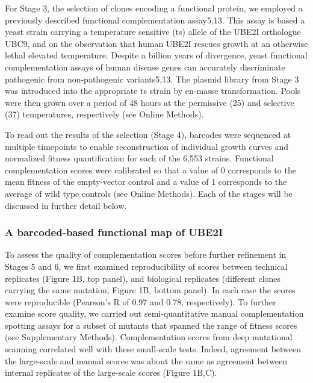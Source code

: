 For Stage 3, the selection of clones encoding a functional protein, we employed a previously described  functional complementation assay5,13. This assay is based a yeast strain carrying a temperature sensitive (ts) allele of the UBE2I orthologue UBC9, and on the observation that human UBE2I rescues growth at an otherwise lethal elevated temperature.  Despite a billion years of divergence, yeast functional complementation assays of human disease genes can accurately discriminate pathogenic from non-pathogenic variants5,13.  The plasmid library from Stage 3 was introduced into the appropriate ts strain by en-masse transformation. Pools were then grown over a period of 48 hours at the permissive (25\celsius ) and selective (37\celsius ) temperatures, respectively (see Online Methods).

To read out the results of the selection (Stage 4), barcodes were sequenced at multiple timepoints to enable reconstruction of individual growth curves and normalized fitness quantification for each of the 6,553 strains. Functional complementation scores were calibrated so that a value of 0 corresponds to the mean fitness of the empty-vector control and a value of 1 corresponds to the average of wild type controls (see Online Methods). Each of the stages will be discussed in further detail below.


\subsubsection{A barcoded-based functional map of UBE2I}

To assess the quality of complementation scores before further refinement in Stages 5 and 6, we first examined reproducibility of scores between technical replicates (Figure 1B, top panel), and biological replicates (different clones carrying the same mutation; Figure 1B, bottom panel).  In each case the scores were reproducible (Pearson’s R of 0.97 and 0.78, respectively).   To further examine score quality, we carried out semi-quantitative manual complementation spotting assays for a subset of mutants that spanned the range of fitness scores (see Supplementary Methods). Complementation scores from deep mutational scanning correlated well with these small-scale tests. Indeed, agreement between the large-scale and manual scores was about the same as agreement between internal replicates of the large-scale scores (Figure 1B,C). 

